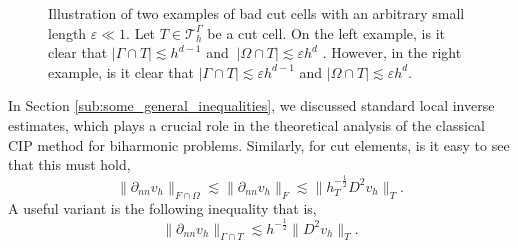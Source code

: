 \documentclass[11pt]{article}
\theoremstyle{remark}
\newcommand{\abs}[1]{\left\lvert #1 \right\rvert}
\numberwithin{equation}{section}
\begin{document}
\begin{figure}[b]
\begin{minipage}{0.4\textwidth}
    \end{minipage}
        \caption{Illustration of two examples of bad cut cells with an arbitrary small length $\varepsilon \ll 1 $. Let $T \in  \mathcal{T}^{\Gamma }_h $ be a cut cell.  On the left example, is it clear that $\abs{ \Gamma \cap T }
            \lesssim  h^{d-1}$ and $  \ \abs{ \Omega  \cap T } \lesssim  \varepsilon  h^{d}$  . However, in the right example, is it clear that  $\abs{ \Gamma \cap T }
            \lesssim  \varepsilon h^{d-1}$ and $\abs{ \Omega  \cap T } \lesssim  \varepsilon  h^{d}$.}
        \label{fig:intersection-example}
\end{figure}


In Section \ref{sub:some_general_inequalities}, we discussed standard local inverse estimates, which plays a crucial role in the theoretical analysis of the classical CIP method for biharmonic problems.
Similarly, for cut elements, is it easy to see that this must hold,
\begin{equation}
    \label{eq:inv_full1}
     \| \partial _{nn}  v_{h} \|_{F \cap \Omega    }^{  }  \lesssim\| \partial _{nn}  v_{h} \|_{F }^{  }  \lesssim   \| h_{T}^{-\frac{1}{2}} D ^2 v_{h} \|_{ T }^{  }.
\end{equation}
A useful variant is the following inequality that is,
\begin{equation}
    \label{eq:inv_full}
\| \partial _{nn} v_{h} \|_{ \Gamma \cap T  }^{  } \lesssim h^{-\frac{1}{2}} \| D^2 v_{h} \|_{ T }^{  }.
\end{equation}
\end{document}
